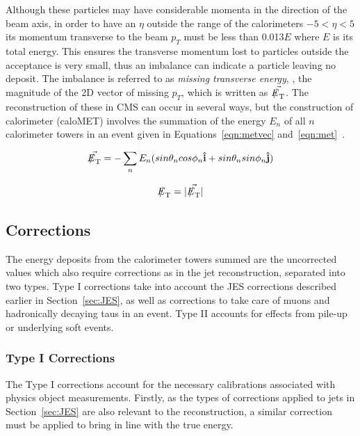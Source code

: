 Although these particles may have considerable momenta in the direction of the beam axis, in order to have an $\eta$ outside the range of the calorimeters $ -5 < \eta < 5$ its momentum transverse to the beam $p_{T}$ must be less than 0.013$E$ where $E$ is its total energy. This ensures the transverse momentum lost to particles outside the acceptance is very small, thus an imbalance can indicate a particle leaving no deposit. The imbalance is referred to as \textit{missing transverse energy}, \met, the magnitude of the 2D vector of missing $p_{T}$, which is written as $\vec{\met}$. The reconstruction of these in CMS can occur in several ways, but the construction of calorimeter \met  (caloMET) involves the summation of the energy $E_{n}$ of all $n$ calorimeter towers in an event given in Equations~\ref{eqn:metvec} and~\ref{eqn:met}~\cite{metrecon}. 

\begin{equation}
\vec{\met} = - \sum_{n} E_{n} (sin \theta_{n} cos \phi_{n} \mathbf{\hat{i}} + sin \theta_{n} sin \phi_{n}  \mathbf{\hat{j}})
\label{eqn:metvec}
\end{equation}

\begin{equation}
\met = | \vec{\met} | 
\label{eqn:met}
\end{equation}

\subsection{\met Corrections}

The energy deposits from the calorimeter towers summed are the uncorrected values which also require corrections as in the jet reconstruction, separated into two types. Type I corrections take into account the JES  corrections described earlier in Section~\ref{sec:JES}, as well as corrections to take care of muons and hadronically decaying taus in an event. Type II  accounts for effects from pile-up or underlying soft events. 
 
\subsubsection{Type I Corrections}
The Type I corrections account for the necessary calibrations associated with physics object measurements. Firstly, as the types of corrections applied to jets in Section~\ref{sec:JES} are also relevant to the \met reconstruction, a similar correction must be applied to bring \met in line with the true energy.


